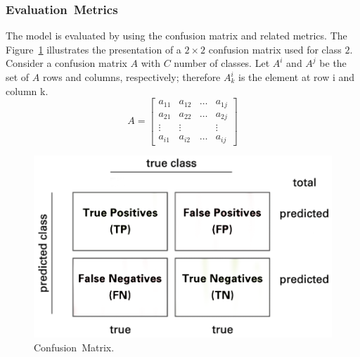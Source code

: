 \documentclass[sensors,article,accept,pdftex,moreauthors]{Definitions/mdpi}
\begin{document}
\subsubsection{Evaluation~Metrics}

The model is evaluated by using the confusion matrix and related metrics. The \mbox{Figure~\ref{fig:confusion-matrix}} illustrates the presentation of a $2 \times 2$ confusion matrix used for class $2$. Consider a confusion matrix $A$ with $C$ number of classes. Let $A^i$ and $A^j$ be the set of $A$ rows and columns, respectively; therefore $A^i_k$ is the element at row i and column k.
\[
A = \begin{bmatrix}
	a_{11} & a_{12} & \dots & a_{1j} \\
	a_{21} & a_{22} & \dots & a_{2j} \\
	\vdots & \vdots	&  & \vdots\\
	a_{i1} & a_{i2} & \dots & a_{ij} 
\end{bmatrix}
\]

\vspace{-12pt}


\begin{figure}[H]
	\begin{minipage}{0.48\textwidth}
		\includegraphics[width=1.1\linewidth]{Definitions/Confusion-matrix}
		\caption{Confusion~Matrix.}\label{fig:confusion-matrix}
	\end{minipage}
	
\end{figure}

\vspace{-12pt}
\end{document}
